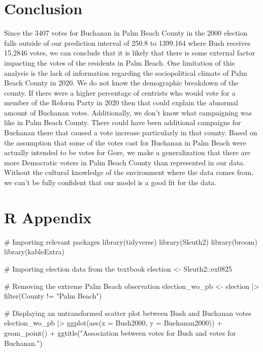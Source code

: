 \documentclass[
  letterpaper,
  DIV=11,
  numbers=noendperiod]{scrartcl}
\newenvironment{Shaded}{\begin{snugshade}}{\end{snugshade}}
\newcommand{\AttributeTok}[1]{\textcolor[rgb]{0.40,0.45,0.13}{#1}}
\newcommand{\CommentTok}[1]{\textcolor[rgb]{0.37,0.37,0.37}{#1}}
\newcommand{\FunctionTok}[1]{\textcolor[rgb]{0.28,0.35,0.67}{#1}}
\newcommand{\NormalTok}[1]{\textcolor[rgb]{0.00,0.23,0.31}{#1}}
\newcommand{\OtherTok}[1]{\textcolor[rgb]{0.00,0.23,0.31}{#1}}
\newcommand{\SpecialCharTok}[1]{\textcolor[rgb]{0.37,0.37,0.37}{#1}}
\newcommand{\StringTok}[1]{\textcolor[rgb]{0.13,0.47,0.30}{#1}}
\begin{document}
\section{Conclusion}\label{conclusion}

Since the 3407 votes for Buchanan in Palm Beach County in the 2000
election falls outside of our prediction interval of 250.8 to 1399.164
where Bush receives 15,2846 votes, we can conclude that it is likely
that there is some external factor impacting the votes of the residents
in Palm Beach. One limitation of this analysis is the lack of
information regarding the sociopolitical climate of Palm Beach County in
2020. We do not know the demographic breakdown of the county. If there
were a higher percentage of centrists who would vote for a member of the
Reform Party in 2020 then that could explain the abnormal amount of
Buchanan votes. Additionally, we don't know what campaigning was like in
Palm Beach County. There could have been additional campaigns for
Buchanan there that caused a vote increase particularly in that county.
Based on the assumption that some of the votes cast for Buchanan in Palm
Beach were actually intended to be votes for Gore, we make a
generalization that there are more Democratic voters in Palm Beach
County than represented in our data. Without the cultural knowledge of
the environment where the data comes from, we can't be fully confident
that our model is a good fit for the data.

\section{R Appendix}\label{r-appendix}

\begin{Shaded}
\begin{Highlighting}[]
\CommentTok{\# Importing relevant packages}
\FunctionTok{library}\NormalTok{(tidyverse)}
\FunctionTok{library}\NormalTok{(Sleuth2)}
\FunctionTok{library}\NormalTok{(broom)}
\FunctionTok{library}\NormalTok{(kableExtra) }

\CommentTok{\# Importing election data from the textbook}
\NormalTok{election }\OtherTok{\textless{}{-}}\NormalTok{ Sleuth2}\SpecialCharTok{::}\NormalTok{ex0825}

\CommentTok{\# Removing the extreme Palm Beach observation}
\NormalTok{election\_wo\_pb }\OtherTok{\textless{}{-}}\NormalTok{ election }\SpecialCharTok{|\textgreater{}} \FunctionTok{filter}\NormalTok{(County }\SpecialCharTok{!=} \StringTok{"Palm Beach"}\NormalTok{)}

\CommentTok{\# Displaying an untransformed scatter plot between Bush and Buchanan votes}
\NormalTok{election\_wo\_pb }\SpecialCharTok{|\textgreater{}} \FunctionTok{ggplot}\NormalTok{(}\FunctionTok{aes}\NormalTok{(}\AttributeTok{x =}\NormalTok{ Bush2000, }\AttributeTok{y =}\NormalTok{ Buchanan2000)) }\SpecialCharTok{+} \FunctionTok{geom\_point}\NormalTok{() }\SpecialCharTok{+} \FunctionTok{ggtitle}\NormalTok{(}\StringTok{"Association between votes for Bush and votes for Buchanan."}\NormalTok{)}
\end{Highlighting}
\end{Shaded}
\end{document}
